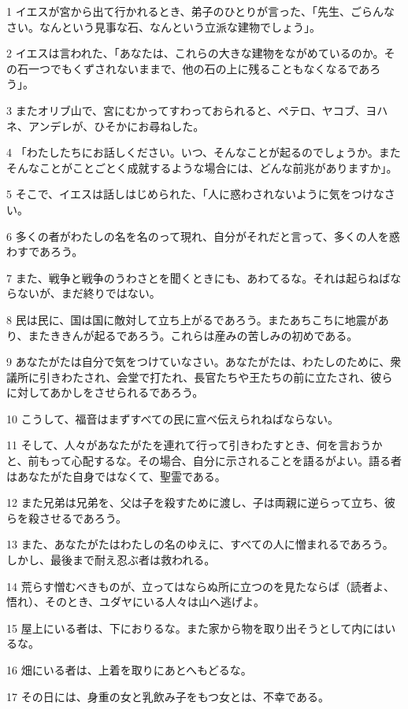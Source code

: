 \par 1 イエスが宮から出て行かれるとき、弟子のひとりが言った、「先生、ごらんなさい。なんという見事な石、なんという立派な建物でしょう」。
\par 2 イエスは言われた、「あなたは、これらの大きな建物をながめているのか。その石一つでもくずされないままで、他の石の上に残ることもなくなるであろう」。
\par 3 またオリブ山で、宮にむかってすわっておられると、ペテロ、ヤコブ、ヨハネ、アンデレが、ひそかにお尋ねした。
\par 4 「わたしたちにお話しください。いつ、そんなことが起るのでしょうか。またそんなことがことごとく成就するような場合には、どんな前兆がありますか」。
\par 5 そこで、イエスは話しはじめられた、「人に惑わされないように気をつけなさい。
\par 6 多くの者がわたしの名を名のって現れ、自分がそれだと言って、多くの人を惑わすであろう。
\par 7 また、戦争と戦争のうわさとを聞くときにも、あわてるな。それは起らねばならないが、まだ終りではない。
\par 8 民は民に、国は国に敵対して立ち上がるであろう。またあちこちに地震があり、またききんが起るであろう。これらは産みの苦しみの初めである。
\par 9 あなたがたは自分で気をつけていなさい。あなたがたは、わたしのために、衆議所に引きわたされ、会堂で打たれ、長官たちや王たちの前に立たされ、彼らに対してあかしをさせられるであろう。
\par 10 こうして、福音はまずすべての民に宣べ伝えられねばならない。
\par 11 そして、人々があなたがたを連れて行って引きわたすとき、何を言おうかと、前もって心配するな。その場合、自分に示されることを語るがよい。語る者はあなたがた自身ではなくて、聖霊である。
\par 12 また兄弟は兄弟を、父は子を殺すために渡し、子は両親に逆らって立ち、彼らを殺させるであろう。
\par 13 また、あなたがたはわたしの名のゆえに、すべての人に憎まれるであろう。しかし、最後まで耐え忍ぶ者は救われる。
\par 14 荒らす憎むべきものが、立ってはならぬ所に立つのを見たならば（読者よ、悟れ）、そのとき、ユダヤにいる人々は山へ逃げよ。
\par 15 屋上にいる者は、下におりるな。また家から物を取り出そうとして内にはいるな。
\par 16 畑にいる者は、上着を取りにあとへもどるな。
\par 17 その日には、身重の女と乳飲み子をもつ女とは、不幸である。
